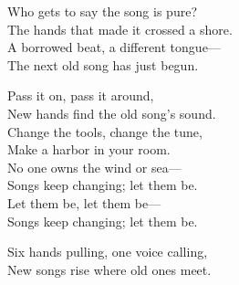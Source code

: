 \begin{lyrics}
Who gets to say the song is pure?\\
The hands that made it crossed a shore.\\
A borrowed beat, a different tongue—\\
The next old song has just begun.

Pass it on, pass it around,\\
New hands find the old song’s sound.\\
Change the tools, change the tune,\\
Make a harbor in your room.\\
No one owns the wind or sea—\\
Songs keep changing; let them be.\\
Let them be, let them be—\\
Songs keep changing; let them be.

Six hands pulling, one voice calling,\\
New songs rise where old ones meet.
\end{lyrics}

